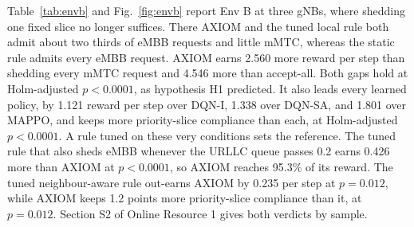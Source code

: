 \documentclass[pdflatex,sn-basic,Numbered]{sn-jnl}
\begin{document}
Table~\ref{tab:envb} and Fig.~\ref{fig:envb} report Env B at three gNBs, where shedding one fixed slice no longer suffices. There AXIOM and the tuned local rule both admit about two thirds of eMBB requests and little mMTC, whereas the static rule admits every eMBB request. AXIOM earns 2.560 more reward per step than shedding every mMTC request and 4.546 more than accept-all. Both gaps hold at Holm-adjusted $p<0.0001$, as hypothesis H1 predicted. It also leads every learned policy, by 1.121 reward per step over DQN-I, 1.338 over DQN-SA, and 1.801 over MAPPO, and keeps more priority-slice compliance than each, at Holm-adjusted $p<0.0001$. A rule tuned on these very conditions sets the reference. The tuned rule that also sheds eMBB whenever the URLLC queue passes 0.2 earns 0.426 more than AXIOM at $p<0.0001$, so AXIOM reaches 95.3\% of its reward. The tuned neighbour-aware rule out-earns AXIOM by 0.235 per step at $p=0.012$, while AXIOM keeps 1.2 points more priority-slice compliance than it, at $p=0.012$. Section S2 of Online Resource 1 gives both verdicts by sample.
\end{document}

